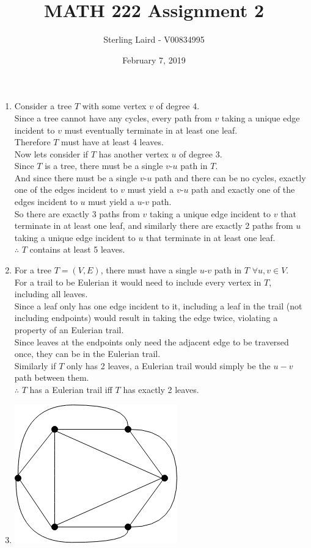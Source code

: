 \documentclass[11pt]{article}
\title{MATH 222 Assignment 2}
\author{Sterling Laird - V00834995}
\date{February 7, 2019}
\begin{document}
\maketitle
\pagebreak

\begin{enumerate}[]
    \item
    	Consider a tree $T$ with some vertex $v$ of degree 4.\\
    	Since a tree cannot have any cycles, every path from $v$ taking a unique edge incident to $v$ must eventually terminate in at least one leaf.\\
    	Therefore $T$ must have at least 4 leaves.\\
    	Now lets consider if $T$ has another vertex $u$ of degree 3.\\
    	Since $T$ is a tree, there must be a single $v$-$u$ path in $T$.\\
    	And since there must be a single $v$-$u$ path and there can be no cycles, exactly one of the edges incident to $v$ must yield a $v$-$u$ path and exactly one of the edges incident to $u$ must yield a $u$-$v$ path.\\
    	So there are exactly 3 paths from $v$ taking a unique edge incident to $v$ that terminate in at least one leaf, and similarly  there are exactly 2 paths from $u$ taking a unique edge incident to $u$ that terminate in at least one leaf.\\
    	$\therefore$ $T$ contains at least 5 leaves.
    \item 
    	For a tree $T=(V,E)$, there must have a single $u$-$v$ path in $T$ $\forall u,v \in V$.\\
    	For a trail to be Eulerian it would need to include every vertex in $T$, including all leaves.\\
    	Since a leaf only has one edge incident to it, including a leaf in the trail (not including endpoints) would result in taking the edge twice, violating a property of an Eulerian trail.\\
    	Since leaves at the endpoints only need the adjacent edge to be traversed once, they can be in the Eulerian trail.\\
    	Similarly if $T$ only has 2 leaves, a Eulerian trail would simply be the $u-v$ path between them.\\
    	$\therefore$ $T$ has a Eulerian trail iff $T$ has exactly 2 leaves.
    \item \mbox{}
    \begin{center}
		\includegraphics[scale=0.5]{q3-graph.png}\\

\end{center}
\end{enumerate}
\end{document}
